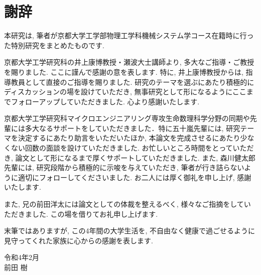 
\chapter*{謝辞}

本研究は, 筆者が京都大学工学部物理工学科機械システム学コース在籍時に行った特別研究をまとめたものです.

京都大学工学研究科の井上康博教授・瀬波大士講師より, 多大なご指導・ご教授を賜りました. ここに謹んで感謝の意を表します. 特に, 井上康博教授からは, 指導教員として直接のご指導を賜りました. 研究のテーマを選ぶにあたり積極的にディスカッションの場を設けていただき, 無事研究として形になるようにここまでフォローアップしていただきました. 心より感謝いたします.

京都大学工学研究科マイクロエンジニアリング専攻生命数理科学分野の同期や先輩には多大なるサポートをしていただきました．特に五十嵐先輩には, 研究テーマを決定するにあたり助言をいただいたほか, 本論文を完成させるにあたり少なくない回数の面談を設けていただきました. お忙しいところ時間をとっていただき, 論文として形になるまで厚くサポートしていただきました. また, 森川健太郎先輩には, 研究段階から積極的に示唆を与えていただき, 筆者が行き詰らないように適切にフォローしてくださいました. お二人には厚く御礼を申し上げ, 感謝いたします.

また, 兄の前田洋太には論文としての体裁を整えるべく, 様々なご指摘をしていただきました. この場を借りてお礼申し上げます.

末筆ではありますが, この4年間の大学生活を, 不自由なく健康で過ごせるように見守ってくれた家族に心からの感謝を表します.

\begin{flushright}
  令和4年2月\\
  前田 樹
\end{flushright}
